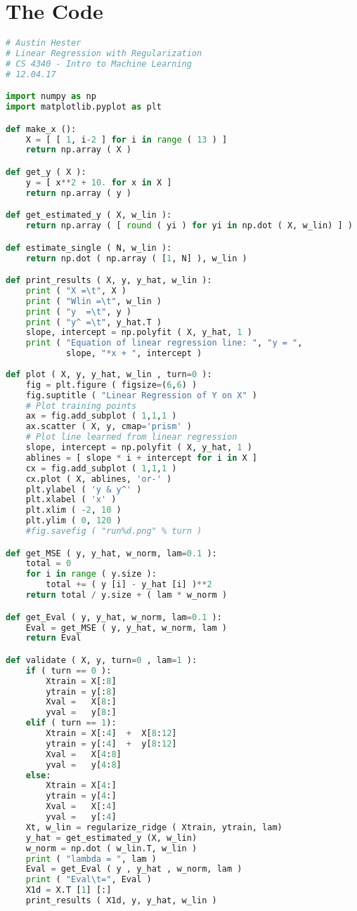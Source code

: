 \documentclass{article}
\begin{document}
\newpage
\section*{The Code}
\lstset{
	frame=tb,
	tabsize=4,
	showstringspaces=false
}
\begin{lstlisting}[language=Python,breaklines=true]
# Austin Hester
# Linear Regression with Regularization
# CS 4340 - Intro to Machine Learning
# 12.04.17

import numpy as np
import matplotlib.pyplot as plt

def make_x ():
    X = [ [ 1, i-2 ] for i in range ( 13 ) ]
    return np.array ( X )

def get_y ( X ):
    y = [ x**2 + 10. for x in X ]
    return np.array ( y )

def get_estimated_y ( X, w_lin ):
    return np.array ( [ round ( yi ) for yi in np.dot ( X, w_lin) ] )

def estimate_single ( N, w_lin ):
    return np.dot ( np.array ( [1, N] ), w_lin )

def print_results ( X, y, y_hat, w_lin ):
    print ( "X =\t", X )
    print ( "Wlin =\t", w_lin )
    print ( "y  =\t", y )
    print ( "y^ =\t", y_hat.T )
    slope, intercept = np.polyfit ( X, y_hat, 1 )
    print ( "Equation of linear regression line: ", "y = ",
            slope, "*x + ", intercept )
    
def plot ( X, y, y_hat, w_lin , turn=0 ):
    fig = plt.figure ( figsize=(6,6) )
    fig.suptitle ( "Linear Regression of Y on X" )
    # Plot training points
    ax = fig.add_subplot ( 1,1,1 )
    ax.scatter ( X, y, cmap='prism' )
    # Plot line learned from linear regression
    slope, intercept = np.polyfit ( X, y_hat, 1 )
    ablines = [ slope * i + intercept for i in X ]
    cx = fig.add_subplot ( 1,1,1 )
    cx.plot ( X, ablines, 'or-' )
    plt.ylabel ( 'y & y^' )
    plt.xlabel ( 'x' )
    plt.xlim ( -2, 10 )
    plt.ylim ( 0, 120 )
    #fig.savefig ( "run%d.png" % turn )

def get_MSE ( y, y_hat, w_norm, lam=0.1 ):
    total = 0
    for i in range ( y.size ):
        total += ( y [i] - y_hat [i] )**2
    return total / y.size + ( lam * w_norm )

def get_Eval ( y, y_hat, w_norm, lam=0.1 ):
    Eval = get_MSE ( y, y_hat, w_norm, lam )
    return Eval

def validate ( X, y, turn=0 , lam=1 ):
    if ( turn == 0 ):
        Xtrain = X[:8]
        ytrain = y[:8]
        Xval =   X[8:]
        yval =   y[8:]
    elif ( turn == 1):
        Xtrain = X[:4]  +  X[8:12]
        ytrain = y[:4]  +  y[8:12]
        Xval =   X[4:8]
        yval =   y[4:8]
    else:
        Xtrain = X[4:]
        ytrain = y[4:]
        Xval =   X[:4]
        yval =   y[:4]
    Xt, w_lin = regularize_ridge ( Xtrain, ytrain, lam)
    y_hat = get_estimated_y (X, w_lin)
    w_norm = np.dot ( w_lin.T, w_lin )
    print ( "lambda = ", lam )
    Eval = get_Eval ( y , y_hat , w_norm, lam )
    print ( "Eval\t=", Eval )
    X1d = X.T [1] [:]
    print_results ( X1d, y, y_hat, w_lin )


\end{lstlisting}
\end{document}

